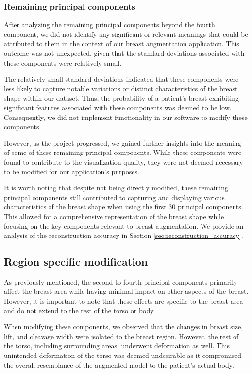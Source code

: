 \subsubsection{Remaining principal components}

After analyzing the remaining principal components beyond the fourth component, we did not identify any significant or relevant meanings that could be attributed to them in the context of our breast 
augmentation application. This outcome was not unexpected, given that the standard deviations associated with these components were relatively small.

The relatively small standard deviations indicated that these components were less likely to capture notable variations or distinct characteristics of the breast shape within our dataset. 
Thus, the probability of a patient's breast exhibiting significant features associated with these components was deemed to be low. Consequently, we did not implement functionality in our 
software to modify these components.

However, as the project progressed, we gained further insights into the meaning of some of these remaining principal components. While these components were found to contribute to the 
visualization quality, they were not deemed necessary to be modified for our application's purposes.

It is worth noting that despite not being directly modified, these remaining principal components still contributed to capturing and displaying various characteristics of the breast 
shape when using the first 30 principal components. This allowed for a comprehensive representation of the breast shape while focusing on the key components relevant to breast augmentation.
We provide an analysis of the reconstruction accuracy in Section \ref{sec:reconstruction_accuracy}.

\subsection{Region specific modification}

As previously mentioned, the second to fourth principal components primarily affect the breast area while having minimal impact on other aspects of the breast. 
However, it is important to note that these effects are specific to the breast area and do not extend to the rest of the torso or body.

When modifying these components, we observed that the changes in breast size, lift, and cleavage width were isolated to the breast region. 
However, the rest of the torso, including surrounding areas, underwent deformation as well. This unintended deformation of the torso was deemed undesirable as it compromised the overall 
resemblance of the augmented model to the patient's actual body.

